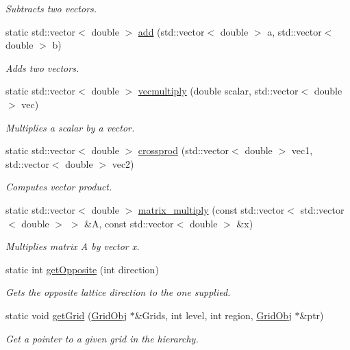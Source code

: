 \begin{DoxyCompactItemize}
\begin{DoxyCompactList}\small\item\em Subtracts two vectors. \end{DoxyCompactList}\item 
static std\+::vector$<$ double $>$ \hyperlink{class_grid_utils_a4e9fc081a19660e9db39428014c04a9c}{add} (std\+::vector$<$ double $>$ a, std\+::vector$<$ double $>$ b)
\begin{DoxyCompactList}\small\item\em Adds two vectors. \end{DoxyCompactList}\item 
static std\+::vector$<$ double $>$ \hyperlink{class_grid_utils_a01eba1d90d3414637d5031850ad89ce3}{vecmultiply} (double scalar, std\+::vector$<$ double $>$ vec)
\begin{DoxyCompactList}\small\item\em Multiplies a scalar by a vector. \end{DoxyCompactList}\item 
static std\+::vector$<$ double $>$ \hyperlink{class_grid_utils_aeb315c03a681483339de9f60ab2964d6}{crossprod} (std\+::vector$<$ double $>$ vec1, std\+::vector$<$ double $>$ vec2)
\begin{DoxyCompactList}\small\item\em Computes vector product. \end{DoxyCompactList}\item 
static std\+::vector$<$ double $>$ \hyperlink{class_grid_utils_a0051918813c63802d79bd7d172e8ad8a}{matrix\+\_\+multiply} (const std\+::vector$<$ std\+::vector$<$ double $>$ $>$ \&A, const std\+::vector$<$ double $>$ \&x)
\begin{DoxyCompactList}\small\item\em Multiplies matrix A by vector x. \end{DoxyCompactList}\item 
static int \hyperlink{class_grid_utils_af3c54e468658879756c71b01abd028d5}{get\+Opposite} (int direction)
\begin{DoxyCompactList}\small\item\em Gets the opposite lattice direction to the one supplied. \end{DoxyCompactList}\item 
static void \hyperlink{class_grid_utils_afac10170d3f6f96a32da6a783b815954}{get\+Grid} (\hyperlink{class_grid_obj}{Grid\+Obj} $\ast$\&Grids, int level, int region, \hyperlink{class_grid_obj}{Grid\+Obj} $\ast$\&ptr)
\begin{DoxyCompactList}\small\item\em Get a pointer to a given grid in the hierarchy. \end{DoxyCompactList}\item 

\end{DoxyCompactItemize}

